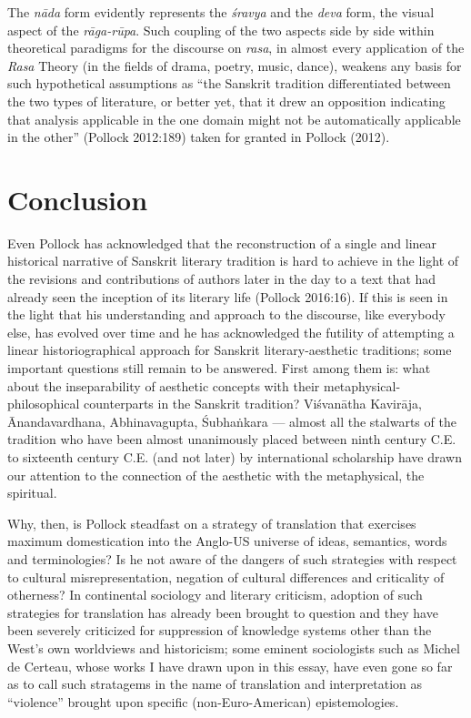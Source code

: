 The \textsl{nāda} form evidently represents the \textsl{śravya} and the \textsl{deva} form, the visual aspect of the \textsl{rāga-rūpa}. Such coupling of the two aspects side by side within theoretical paradigms for the discourse on \textsl{rasa}, in almost every application of the \textsl{Rasa} Theory (in the fields of drama, poetry, music, dance), weakens any basis for such hypothetical assumptions as “the Sanskrit tradition differentiated between the two types of literature, or better yet, that it drew an opposition indicating that analysis applicable in the one domain might not be automatically applicable in the other” (Pollock 2012:189) taken for granted in Pollock (2012).

\section*{Conclusion}

Even Pollock has acknowledged that the reconstruction of a single and linear historical narrative of Sanskrit literary tradition is hard to achieve in the light of the revisions and contributions of authors later in the day to a text that had already seen the inception of its literary life (Pollock 2016:16). If this is seen in the light that his understanding and approach to the discourse, like everybody else, has evolved over time and he has acknowledged the futility of attempting a linear historiographical approach for Sanskrit literary-aesthetic traditions; some important questions still remain to be answered. First among them is: what about the inseparability of aesthetic concepts with their metaphysical-philosophical counterparts in the Sanskrit tradition? Viśvanātha Kavirāja, Ānandavardhana, Abhinavagupta, Śubhaṅkara --- almost all the stalwarts of the tradition who have been almost unanimously placed between ninth century C.E. to sixteenth century C.E. (and not later) by international scholarship have drawn our attention to the connection of the aesthetic with the metaphysical, the spiritual. 

Why, then, is Pollock steadfast on a strategy of translation that exercises maximum domestication into the Anglo-US universe of ideas, semantics, words and terminologies? Is he not aware of the dangers of such strategies with respect to cultural misrepresentation, negation of cultural differences and criticality of otherness? In continental sociology and literary criticism, adoption of such strategies for translation has already been brought to question and they have been severely criticized for suppression of knowledge systems other than the West’s own worldviews and historicism; some eminent sociologists such as Michel de Certeau, whose works I have drawn upon in this essay, have even gone so far as to call such stratagems in the name of translation and interpretation as “violence” brought upon specific (non-Euro-American) epistemologies. 

